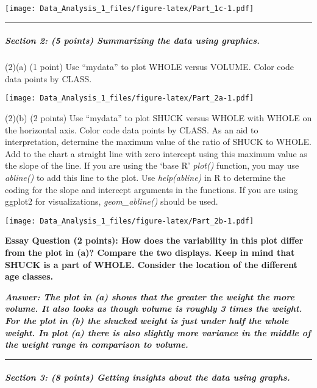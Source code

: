\documentclass[
]{article}
\begin{document}
\texttt{[image: Data\_Analysis\_1\_files/figure-latex/Part\_1c-1.pdf]}

\begin{center}\rule{0.5\linewidth}{0.5pt}\end{center}

\hypertarget{section-2-5-points-summarizing-the-data-using-graphics.}{%
\subparagraph{Section 2: (5 points) Summarizing the data using
graphics.}\label{section-2-5-points-summarizing-the-data-using-graphics.}}

(2)(a) (1 point) Use ``mydata'' to plot WHOLE versus VOLUME. Color code
data points by CLASS.

\texttt{[image: Data\_Analysis\_1\_files/figure-latex/Part\_2a-1.pdf]}

(2)(b) (2 points) Use ``mydata'' to plot SHUCK versus WHOLE with WHOLE
on the horizontal axis. Color code data points by CLASS. As an aid to
interpretation, determine the maximum value of the ratio of SHUCK to
WHOLE. Add to the chart a straight line with zero intercept using this
maximum value as the slope of the line. If you are using the `base R'
\emph{plot()} function, you may use \emph{abline()} to add this line to
the plot. Use \emph{help(abline)} in R to determine the coding for the
slope and intercept arguments in the functions. If you are using ggplot2
for visualizations, \emph{geom\_abline()} should be used.

\texttt{[image: Data\_Analysis\_1\_files/figure-latex/Part\_2b-1.pdf]}

\textbf{Essay Question (2 points): How does the variability in this plot
differ from the plot in (a)? Compare the two displays. Keep in mind that
SHUCK is a part of WHOLE. Consider the location of the different age
classes.}

\textbf{\emph{Answer: The plot in (a) shows that the greater the weight
the more volume. It also looks as though volume is roughly 3 times the
weight. For the plot in (b) the shucked weight is just under half the
whole weight. In plot (a) there is also slightly more variance in the
middle of the weight range in comparison to volume. }}

\begin{center}\rule{0.5\linewidth}{0.5pt}\end{center}

\hypertarget{section-3-8-points-getting-insights-about-the-data-using-graphs.}{%
\subparagraph{Section 3: (8 points) Getting insights about the data
using
graphs.}\label{section-3-8-points-getting-insights-about-the-data-using-graphs.}}
\end{document}
